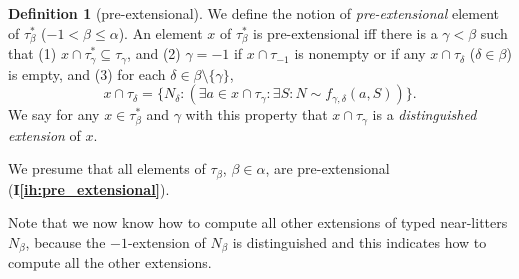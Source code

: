 \documentclass[112pt]{article}
\theoremstyle{definition}
\newtheorem{definition}[theorem]{Definition}
\theoremstyle{remark}
\newcommand{\ihref}[1]{(\textbf{I\ref{#1}})}
\newenvironment{annot}{\begin{center}\color{blue}\sl}{\end{center}}
\begin{document}
\begin{definition}[pre-extensional]\label{def:pre_extensional}
We define the notion of {\em pre-extensional\/} element of $\tau^*_\beta$ ($-1 <\beta \leq \alpha$).   An element $x$ of $\tau^*_\beta$ is pre-extensional iff there is a $\gamma<\beta$ such that (1) $x \cap \tau^*_\gamma \subseteq \tau_\gamma$, and (2) $\gamma=-1$ if
$x \cap \tau_{-1}$ is nonempty or if any $x \cap \tau_\delta$ ($\delta \in \beta$) is empty,  and (3) for each $\delta \in \beta \setminus \{\gamma\}$, $$x \cap \tau_\delta= \{N_\delta:(\exists a \in x\cap \tau_\gamma:\exists S:N \sim f_{\gamma,\delta}(a,S))\}.$$  We say for any $x \in \tau^*_\beta$ and $\gamma$ with this property that $x \cap \tau_\gamma$ is a {\em distinguished extension\/} of $x$.
\end{definition}

We presume that all elements of $\tau_\beta$, $\beta\in \alpha$, are pre-extensional \ihref{ih:pre_extensional}.

\begin{comment}
\begin{annot}
  This hypothesis \ihref{ih:pre_extensional} is not used in Lean.
  The objects we construct at stage $\alpha$ satisfy this property, but we don't use this outside of (Lean's equivalent of) section 3, and we never need to know that lower-type objects satisfy it.
  I believe that this hypothesis is only tacitly used in the form that allowable permutations preserve (pre-)extensionality.
\end{annot}
\end{comment}



Note that we now know how to compute all other extensions of typed near-litters $N_\beta$, because the $-1$-extension of $N_\beta$ is distinguished and this indicates how to compute all the other extensions.
\end{document}
